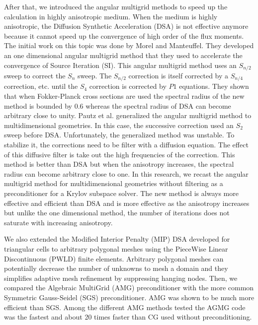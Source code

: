 After that, we introduced the angular multigrid methods to speed up
the calculation in highly anisotropic medium. When the medium is highly
anisotropic, the Diffusion Synthetic Acceleration (DSA) is not effective
anymore because it cannot speed up the convergence of high order of the 
flux moments. The initial work on this topic was done by Morel and Manteuffel. 
They developed an one dimensional angular multigrid method that they used to
accelerate the convergence of Source Iteration (SI). This angular multigrid 
method uses an $S_{n/2}$ sweep to correct the $S_n$ sweep. The $S_{n/2}$ 
correction is itself corrected by a $S_{n/4}$ correction, etc. until the 
$S_4$ correction is corrected by $P1$ equations. They shown that when 
Fokker-Planck cross sections are used the spectral radius of the new 
method is bounded by 0.6 whereas the spectral radius of DSA can become 
arbitrary close to unity. Pautz et al. generalized the angular multigrid 
method to multidimensional geometries. In this case, the successive correction
used an $S_2$ sweep before DSA. Unfortunately, the generalized method was 
unstable. To stabilize it, the corrections need to be filter with a 
diffusion equation. The effect of this diffusive filter is take out the high 
frequencies of the correction. This method is better than DSA but when the
anisotropy increases, the spectral radius can become arbitrary close to one.
In this research, we recast the angular multigrid method for
multidimensional geometries without filtering as a preconditioner for a Krylov
subspace solver. The new method is always more effective and efficient than 
DSA and is more effective as the anisotropy increases but unlike the one 
dimensional method, the number of iterations does not saturate with 
increasing anisotropy.

We also extended the Modified Interior Penalty (MIP) DSA
developed for triangular cells to arbitrary polygonal meshes using the
PieceWise Linear Discontinuous (PWLD) finite elements. Arbitrary polygonal
meshes can potentially decrease the number of unknowns to mesh a domain and
they simplifies adaptive mesh refinement by suppressing hanging nodes. Then, 
we compared the Algebraic MultiGrid (AMG) preconditioner with the more 
common Symmetric Gauss-Seidel (SGS) preconditioner. AMG was shown to be much 
more efficient than SGS. Among the different AMG methods tested the AGMG code 
was the fastest and about 20 times faster than CG used without preconditioning.
